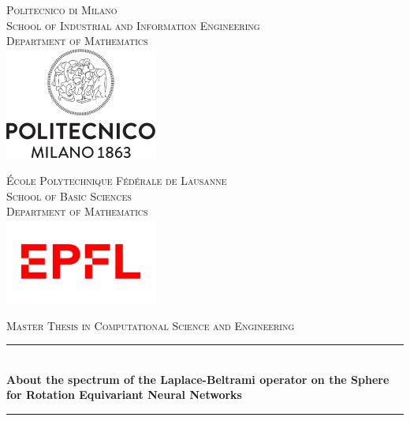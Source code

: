 
\begin{titlepage}
\newcommand{\HRule}{\rule{\linewidth}{1mm}} %
\begin{minipage}[t]{.49\textwidth}
	\raggedleft
	\center
	\textsc{\footnotesize Politecnico di Milano}\\
	\textsc{ \scriptsize School of Industrial and Information Engineering}\\
	\textsc{\scriptsize Department of Mathematics}\\[0.5cm]
	\includegraphics[width=5cm]{figs/cover/polimi.png}
\end{minipage}
\hfill
%
\begin{minipage}[t]{.49\textwidth}
	\raggedright
	\center
	\textsc{\footnotesize \'Ecole Polytechnique F\'ed\'erale de Lausanne}\\
	\textsc{\scriptsize School of Basic Sciences}\\
	\textsc{\scriptsize Department of Mathematics}\\[0.8cm]
	\includegraphics[width=5cm]{figs/cover/EPFL.jpg}
\end{minipage}
\center %
\vspace{2cm}





\textsc{\large Master Thesis in Computational Science and Engineering}\\[1.5cm]

\HRule \\[0.4cm]
{ \LARGE \bfseries About the spectrum of the Laplace-Beltrami operator on the Sphere for Rotation Equivariant Neural Networks}\\[0.4cm] 
\HRule \\[1.5cm]     
\vfill 


\end{titlepage}
